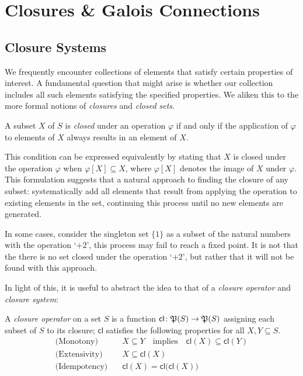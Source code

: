 \section{Closures \& Galois Connections}
\label{section:closure-systems}

\subsection{Closure Systems}
We frequently encounter collections of elements that satisfy certain properties of interest. A fundamental question that
might arise is whether our collection includes all such elements satisfying the specified properties. We aliken this to
the more formal notions of \textit{closures} and \textit{closed sets}.

\begin{definition}
	 \label{definition:closed-set}

	A subset $X$ of $S$ is \textit{closed} under an operation $\varphi$ if and only if the application of $\varphi$ to elements
	of $X$ always results in an element of $X$.
\end{definition}

This condition can be expressed equivalently by stating that $X$ is closed under the operation $\varphi$ when $\varphi [X
] \subseteq X$, where $\varphi[X]$ denotes the image of $X$ under $\varphi$. This formulation suggests that a natural approach
to finding the closure of any subset: systematically add all elements that result from applying the operation to
existing elements in the set, continuing this process until no new elements are generated.

In some cases, consider the singleton set $\{1\}$ as a subset of the natural numbers with the operation `$+ 2$', this process
may fail to reach a fixed point. It is not that the there is no set closed under the operation `$+2$', but rather that it
will not be found with this approach.

In light of this, it is useful to abstract the idea to that of a \textit{closure operator} and \textit{closure system}:

\begin{definition}
	 \label{definition:closure-operator}

	A \emph{closure operator} on a set $S$ is a function $\mathsf{cl}\colon \mathfrak{P}({S})\to \mathfrak{P}({S})$ assigning each subset of
	$S$ to its closure; $\mathsf{cl}$ satisfies the following properties for all $X,Y \subseteq S$.
	\begin{align}
		\text{(Monotony)}\quad    & X \subseteq Y\quad \text{implies}\quad\mathsf{cl}(X) \subseteq \mathsf{cl}(Y) \\
		\text{(Extensivity)}\quad & X \subseteq \mathsf{cl}(X)                                                    \\
		\text{(Idempotency)}\quad & \mathsf{cl}(X) = \mathsf{cl}\big(\mathsf{cl}(X)\big)
	\end{align}
\end{definition}

